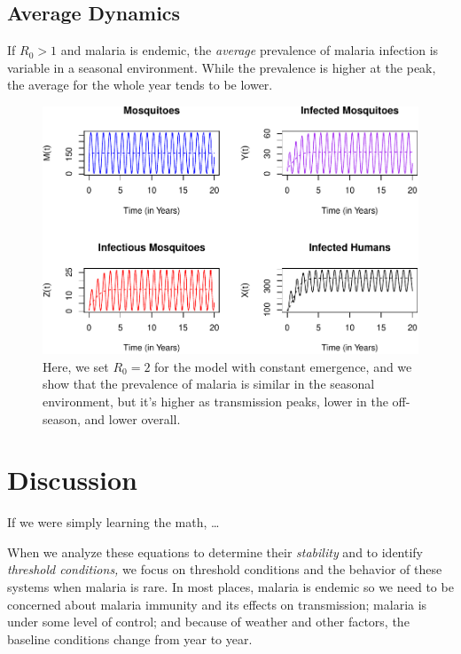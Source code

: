 \documentclass[
]{book}
\begin{document}
\clearpage

\hypertarget{average-dynamics}{%
\subsection{Average Dynamics}\label{average-dynamics}}

If \(R_0>1\) and malaria is endemic, the \emph{average} prevalence of malaria infection is variable in a seasonal environment. While the prevalence is higher at the peak, the average for the whole year tends to be lower.

\begin{figure}
\centering
\includegraphics{_main_files/figure-latex/compareTS-1.pdf}
\caption{\label{fig:compareTS}Here, we set \(R_0= 2\) for the model with constant emergence, and we show that the prevalence of malaria is similar in the seasonal environment, but it's higher as transmission peaks, lower in the off-season, and lower overall.}
\end{figure}

\hypertarget{discussion}{%
\section{Discussion}\label{discussion}}

If we were simply learning the math, \ldots{}

When we analyze these equations to determine their \emph{stability} and to identify \emph{threshold conditions,} we focus on threshold conditions and the behavior of these systems when malaria is rare. In most places, malaria is endemic so we need to be concerned about malaria immunity and its effects on transmission; malaria is under some level of control; and because of weather and other factors, the baseline conditions change from year to year.
\end{document}
